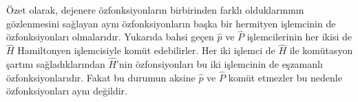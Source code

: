 \documentclass[a4paper,12pt, twoside]{article}
\begin{document}
Özet olarak, dejenere özfonksiyonların birbirinden farklı olduklarınının gözlenmesini sağlayan aynı özfonksiyonların başka bir hermityen işlemcinin de özfonksiyonları olmalarıdır. Yukarıda bahsi geçen  $\hat p$ ve $\hat P$ işlemcilerinin her ikisi de $\hat H$ Hamiltonyen işlemcisiyle komüt edebilirler. Her iki işlemci de $\hat H$ ile komütasyon şartını sağladıklarından $\hat H$'nin özfonsiyonları bu iki işlemcinin de eşzamanlı özfonksiyonlarıdır. Fakat bu durumun aksine $\hat p$ ve $\hat P$ komüt etmezler bu nedenle özfonksiyonları aynı değildir.



\renewcommand\refname{Kaynaklar}
{}
 
\end{document}
